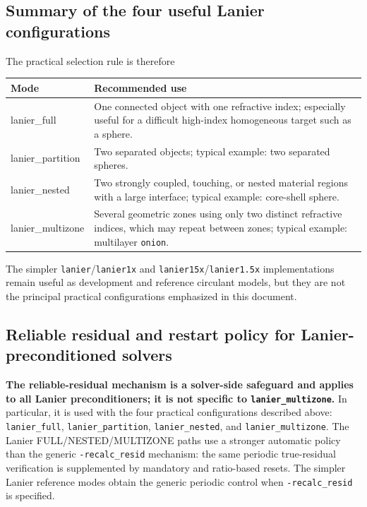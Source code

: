 \documentclass[11pt,a4paper]{article}
\begin{document}
\subsection{Summary of the four useful Lanier configurations}

The practical selection rule is therefore
\begin{center}
\begin{tabular}{>{\ttfamily}p{3.4cm} p{10.7cm}}
\toprule
\textnormal{Mode} & \textnormal{Recommended use} \\
\midrule
lanier\_full & One connected object with one refractive index; especially useful for a difficult high-index homogeneous target such as a sphere. \\
lanier\_partition & Two separated objects; typical example: two separated spheres. \\
lanier\_nested & Two strongly coupled, touching, or nested material regions with a large interface; typical example: core-shell sphere. \\
lanier\_multizone & Several geometric zones using only two distinct refractive indices, which may repeat between zones; typical example: multilayer \texttt{onion}. \\
\bottomrule
\end{tabular}
\end{center}

The simpler \texttt{lanier}/\texttt{lanier1x} and \texttt{lanier15x}/\texttt{lanier1.5x} implementations remain useful as development and reference circulant models, but they are not the principal practical configurations emphasized in this document.

\subsection{Reliable residual and restart policy for Lanier-preconditioned solvers}

\textbf{The reliable-residual mechanism is a solver-side safeguard and applies to all Lanier preconditioners; it is not specific to \texttt{lanier\_multizone}.} In particular, it is used with the four practical configurations described above: \texttt{lanier\_full}, \texttt{lanier\_partition}, \texttt{lanier\_nested}, and \texttt{lanier\_multizone}. The Lanier FULL/NESTED/MULTIZONE paths use a stronger automatic policy than the generic \texttt{-recalc\_resid} mechanism: the same periodic true-residual verification is supplemented by mandatory and ratio-based resets. The simpler Lanier reference modes obtain the generic periodic control when \texttt{-recalc\_resid} is specified.
\end{document}
